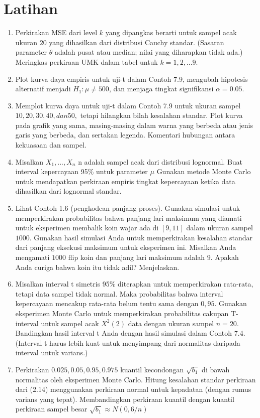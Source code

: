 \documentclass[a4paper,12pt]{article}
\theoremstyle{definition}
\begin{document}
\section{Latihan}
\begin{enumerate}
    \item Perkirakan MSE dari level $k$ yang  dipangkas berarti 
          untuk sampel acak ukuran $20$ yang dihasilkan dari distribusi Cauchy standar. (Sasaran parameter $\theta$ adalah pusat atau median; nilai yang diharapkan tidak ada.) Meringkas perkiraan UMK dalam tabel untuk $k = 1,2,...9.$
    \item Plot kurva daya empiris untuk uji-t dalam 
          Contoh 7.9, mengubah hipotesis alternatif menjadi $H_{1} : \mu \neq 500$, dan menjaga tingkat signifikansi $\alpha =0.05$.
    \item Memplot kurva daya untuk uji-t dalam Contoh 7.9  untuk ukuran sampel $10, 
          20, 30, 40, dan 50,$ tetapi hilangkan bilah kesalahan standar. Plot kurva pada grafik yang sama, masing-masing dalam warna yang berbeda atau jenis garis yang berbeda, dan sertakan legenda. Komentari hubungan antara kekuasaan dan sampel.
    \item Misalkan $X_{1},...,X_{n}$ n adalah 
          sampel acak dari distribusi lognormal. Buat interval kepercayaan 95\% untuk parameter $\mu $ Gunakan metode Monte Carlo untuk mendapatkan perkiraan empiris tingkat kepercayaan ketika data dihasilkan dari lognormal standar.
    \item Lihat Contoh 1.6 (pengkodean panjang 
        proses). Gunakan simulasi untuk memperkirakan probabilitas bahwa panjang lari maksimum yang diamati untuk eksperimen membalik koin wajar ada di $[9, 11]$ dalam ukuran sampel $1000.$ Gunakan hasil simulasi Anda untuk memperkirakan kesalahan standar dari panjang eksekusi maksimum untuk eksperimen ini. Misalkan Anda mengamati $1000$ flip koin dan panjang lari maksimum adalah $9$. Apakah Anda curiga bahwa koin itu tidak adil? Menjelaskan.
    \item Misalkan interval t simetris 95\% diterapkan untuk memperkirakan rata-rata, tetapi data sampel tidak normal. Maka probabilitas bahwa interval kepercayaan mencakup rata-rata belum tentu sama dengan $0,95$. Gunakan eksperimen Monte Carlo untuk memperkirakan probabilitas cakupan T-interval untuk sampel acak $X^{2}(2)$ data dengan ukuran sampel $n=20.$ Bandingkan hasil interval t Anda dengan hasil simulasi dalam Contoh 7.4. (Interval t harus lebih kuat untuk menyimpang dari normalitas
daripada interval untuk varians.)
\item Perkirakan $ 0.025, 0.05, 0.95, 0.975$ kuantil kecondongan $\sqrt{b_{1}}$ di bawah normalitas oleh eksperimen Monte Carlo. Hitung kesalahan standar perkiraan dari (2.14) menggunakan perkiraan normal untuk kepadatan (dengan rumus varians yang tepat). Membandingkan perkiraan kuantil dengan kuantil perkiraan sampel besar $\sqrt{b_{1}} \approx N\left ( 0,6/n \right )$

\end{enumerate}
\end{document}
